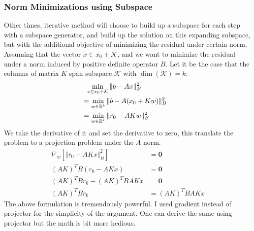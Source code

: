 \documentclass[]{article}
\theoremstyle{definition}
\begin{document}
        \subsubsection{Norm Minimizations using Subspace}\label{sec:1.4}
            Other times, iterative method will choose to build up a subspace for each step with a subspace generator, and build up the solution on this expanding subspace, but with the additional objective of minimizing the residual under certain norm. Assuming that the vector $x\in x_0 + \mathcal{K}$, and we want to minimize the residual under a norm induced by positive definite operator $B$. Let it be the case that the columns of matrix $K$ span subspace $\mathcal{K}$ with $\dim(\mathcal K) = k$. 
            \begin{align}
                &\hspace{0.6em} \min_{x\in x_0 + \mathcal{K}} \Vert b - Ax\Vert_B^2 
                \\
                &= \min_{w\in \mathbb{R}^{k}} 
                \Vert b - A(x_0 + Kw)\Vert_B^2 & 
                \\
                &= \min_{w\in \mathbb{R}^{k}} 
                \Vert 
                    r_0 - AKw
                \Vert_B^2
            \end{align}
            We take the derivative of it and set the derivative to zero, this translate the problem to a projection problem under the $A$ norm. 
            \begin{align}
                \nabla_w \left[
                    \Vert r_0 - AKx\Vert_B^2
                \right] &= \mathbf{0}
                \\
                (AK)^TB(r_0 - AKx) &= \mathbf{0}
                \\
                (AK)^TBr_0 - (AK)^TBAKx &= \mathbf{0}
                \\
                (AK)^TBr_0 &= (AK)^TBAKx
            \end{align}
            The above formulation is tremendously powerful. I used gradient instead of projector for the simplicity of the argument. One can derive the same using projector but the math is bit more hedious. 
\end{document}

